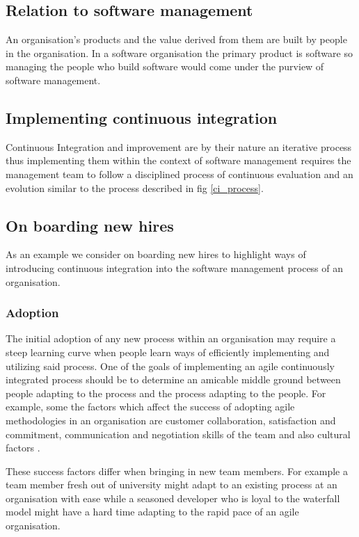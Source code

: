 \documentclass[12pt,conference]{IEEEtran}
\begin{document}
\subsection*{Relation to software management}

An organisation's products and the value derived from them are built by people in the organisation. In a software organisation the primary product is software so managing the people who build software would come under the purview of software management. 

\subsection*{Implementing continuous integration}

Continuous Integration and improvement are by their nature an iterative process thus implementing them within the context of software management requires the management team to follow a disciplined process of continuous evaluation and an evolution similar to the process described in fig \ref{ci_process}.

\subsection*{On boarding new hires}

As an example we consider on boarding new hires to highlight ways of introducing continuous integration into the software management process of an organisation.

\subsubsection*{Adoption}

The initial adoption of any new process within an organisation may require a steep learning curve when people learn ways of efficiently implementing and utilizing said process. One of the goals of implementing an agile continuously integrated process should be to determine an amicable middle ground between people adapting to the process and the process adapting to the people. For example, some the factors which affect the success of adopting agile methodologies in an organisation are customer collaboration, satisfaction and commitment, communication and negotiation skills of the team and also cultural factors \cite{misra_identifying_2009}.

These success factors differ when bringing in new team members. For example a team member fresh out of university might adapt to an existing process at an organisation with ease while a seasoned developer who is loyal to the waterfall model might have a hard time adapting to the rapid pace of an agile organisation. 
\end{document}
